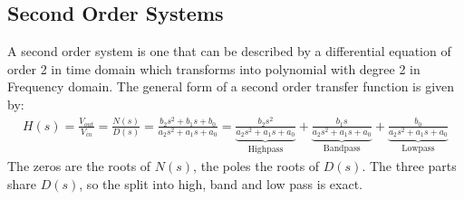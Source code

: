 \subsection{Second Order Systems}\label{sec:theory_cs_second_order}

A second order system is one that can be described by a
differential equation of order 2 in time domain which
transforms into polynomial with degree 2 in Frequency
domain. The general form of a second order transfer
function is given by:
\begin{align*}
  H(s) = \frac{V_{out}}{V_{in}} = \frac{N(s)}{D(s)} = \frac{b_2 s^2 + b_1 s + b_0}{a_2 s^2 + a_1 s + a_0} = \underbrace{\frac{b_2 s^2}{a_2 s^2+a_1 s+a_0}}_{\text{Highpass}} + \underbrace{\frac{b_1 s}{a_2 s^2+a_1 s+a_0}}_{\text{Bandpass}} + \underbrace{\frac{b_0}{a_2 s^2+a_1 s+a_0}}_{\text{Lowpass}}
\end{align*}
The zeros are the roots of \(N(s)\), the poles the roots of \(D(s)\). The
three parts share \(D(s)\), so the split into high, band and low pass is
exact.

